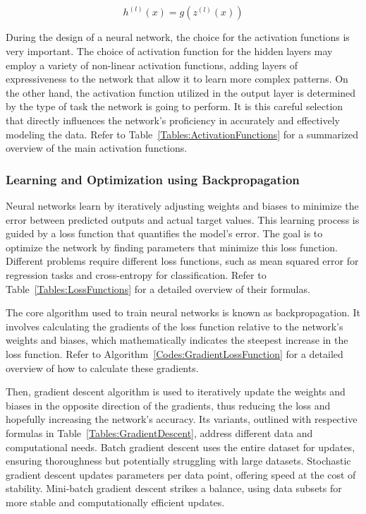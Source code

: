 \begin{equation}
h^{(l)}(x) = g(z^{(l)}(x))
\end{equation}

During the design of a neural network, the choice for the activation functions is very important. The choice of activation function for the hidden layers may employ a variety of non-linear activation functions, adding layers of expressiveness to the network that allow it to learn more complex patterns. On the other hand, the activation function utilized in the output layer is determined by the type of task the network is going to perform. It is this careful selection that directly influences the network's proficiency in accurately and effectively modeling the data. Refer to Table~\ref{Tables:ActivationFunctions} for a summarized overview of the main activation functions.



\subsubsection{Learning and Optimization using Backpropagation}
Neural networks learn by iteratively adjusting weights and biases to minimize the error between predicted outputs and actual target values. This learning process is guided by a loss function that quantifies the model's error. The goal is to optimize the network by finding parameters that minimize this loss function. Different problems require different loss functions, such as mean squared error for regression tasks and cross-entropy for classification. Refer to Table~\ref{Tables:LossFunctions} for a detailed overview of their formulas.



The core algorithm used to train neural networks is known as backpropagation. It involves calculating the gradients of the loss function relative to the network's weights and biases, which mathematically indicates the steepest increase in the loss function. Refer to Algorithm~\ref{Codes:GradientLossFunction} for a detailed overview of how to calculate these gradients.



Then, gradient descent algorithm is used to iteratively update the weights and biases in the opposite direction of the gradients, thus reducing the loss and hopefully increasing the network's accuracy. Its variants, outlined with respective formulas in Table~\ref{Tables:GradientDescent}, address different data and computational needs. Batch gradient descent uses the entire dataset for updates, ensuring thoroughness but potentially struggling with large datasets. Stochastic gradient descent updates parameters per data point, offering speed at the cost of stability. Mini-batch gradient descent strikes a balance, using data subsets for more stable and computationally efficient updates.

